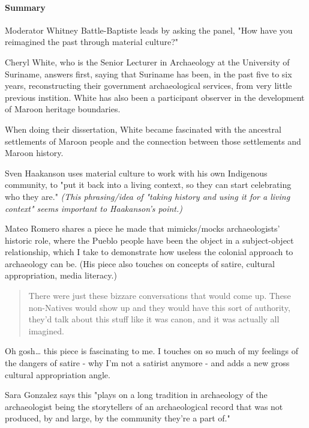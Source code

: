 \documentclass[11pt]{article}
\begin{document}
\paragraph*{Summary}
\label{sec:org6458c36}
Moderator Whitney Battle-Baptiste leads by asking the panel, "How have you reimagined the past through material culture?"

Cheryl White, who is the Senior Lecturer in Archaeology at the University of Suriname, answers first, saying that Suriname has been, in the past five to six years, reconstructing their government archaeological services, from very little previous instition. White has also been a participant observer in the development of Maroon heritage boundaries.

When doing their dissertation, White became fascinated with the ancestral settlements of Maroon people and the connection between those settlements and Maroon history.

Sven Haakanson uses material culture to work with his own Indigenous community, to "put it back into a living context, so they can start celebrating who they are." \emph{(This phrasing/idea of "taking history and using it for a living context" seems important to Haakanson's point.)}

Mateo Romero shares a piece he made that mimicks/mocks archaeologists' historic role, where the Pueblo people have been the object in a subject-object relationship, which I take to demonstrate how useless the colonial approach to archaeology can be. (His piece also touches on concepts of satire, cultural appropriation, media literacy.)

\begin{quote}
There were just these bizzare conversations that would come up. These non-Natives would show up and they would have this sort of authority, they'd talk about this stuff like it was canon, and it was actually all imagined.
\end{quote}

\begin{aside}
Oh gosh… this piece is fascinating to me. I touches on so much of my feelings of the dangers of satire - why I'm not a satirist anymore - and adds a new gross cultural appropriation angle.
\end{aside}

Sara Gonzalez says this "plays on a long tradition in archaeology of the archaeologist being the storytellers of an archaeological record that was not produced, by and large, by the community they're a part of."
\end{document}
